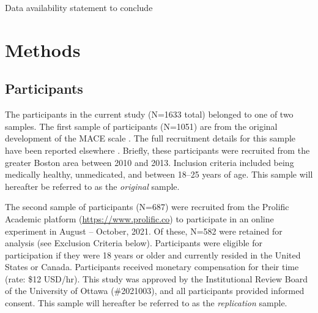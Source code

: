 \documentclass[letterpaper,man,natbib,floatsintext,longtable]{apa6}
\begin{document}

Data availability statement to conclude

\section{Methods}

\subsection{Participants}

The participants in the current study (N=1633 total) belonged to one of two samples. The first sample of participants (N=1051) are from the original development of the MACE scale \citep{teicher2015maltreatment}. The full recruitment details for this sample have been reported elsewhere \citep{teicher2015maltreatment}. Briefly, these participants were recruited from the greater Boston area between 2010 and 2013. Inclusion criteria included being medically healthy, unmedicated, and between 18–25 years of age.  This sample will hereafter be referred to as the \textit{original} sample. 

The second sample of participants (N=687) were recruited from the Prolific Academic platform (\url{https://www.prolific.co}) to participate in an online experiment in August -- October, 2021. Of these, N=582 were retained for analysis (see Exclusion Criteria below). Participants were eligible for participation if they were 18 years or older and currently resided in the United States or Canada. Participants received monetary compensation for their time (rate: \$12 USD/hr). This study was approved by the Institutional Review Board of the University of Ottawa (\#2021003), and all participants provided informed consent. This sample will hereafter be referred to as the \textit{replication} sample. 
\end{document}
